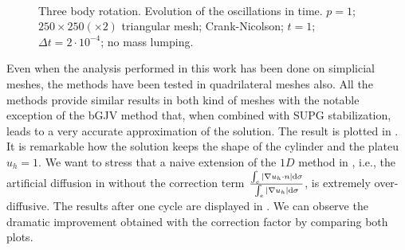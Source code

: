 \begin{figure}%
\centering
{}%
\\%
\caption{Three body rotation. Evolution of the oscillations in time. $p=1$; $250\times 250 (\times 2)$ triangular mesh; Crank-Nicolson; $t=1$; $\Delta t = 2 \cdot 10^{-4}$; no mass lumping.}\label{fig-osctime}
\end{figure}

Even when the analysis performed in this work has been done on simplicial meshes, the methods have been tested in quadrilateral meshes also. All the methods provide similar results in both kind of meshes with the notable exception of the bGJV method that, when combined with SUPG stabilization, leads to a very accurate approximation of the solution. The result is plotted in . It is remarkable how the solution keeps the shape of the cylinder and the plateu $u_h=1$. We want to stress that a naive extension of the $1D$ method in \cite{burman_nonlinear_2007}, i.e., the artificial diffusion in  without the correction term $\frac{\int_e |\nabla u_h \cdot n|{\rm d} \sigma}{\int_e |\nabla u_h| {\rm d} \sigma}$, is extremely over-diffusive. The results after one cycle are displayed in . We can observe the dramatic improvement obtained with the correction factor by comparing both plots.

